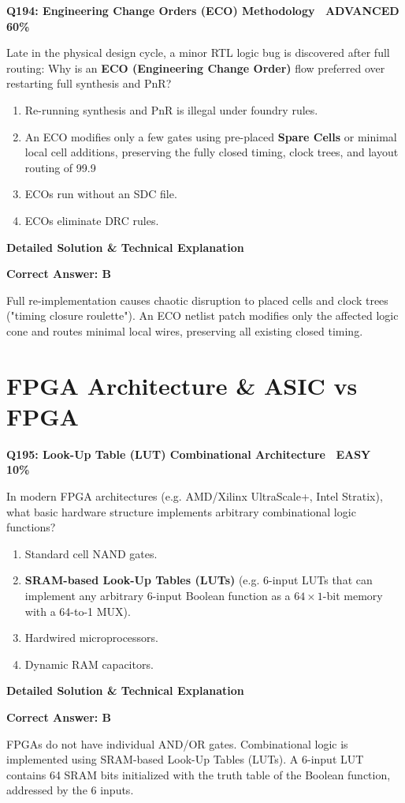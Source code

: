 \documentclass[11pt,a4paper]{article}
\newcommand{\badgeadv}{{\color{white}\colorbox{advred}{\bfseries\sffamily\tiny\ ADVANCED 60\%\ }}}
\newcommand{\badgeeasy}{{\color{white}\colorbox{easygreen}{\bfseries\sffamily\tiny\ EASY 10\%\ }}}
\newenvironment{qbox}[2]{%
  \begin{mdframed}[style=qstyle]%
  {\bfseries\sffamily\color{primaryblue}#1 \hfill #2}\par\vspace{2pt}%
}{%
  \end{mdframed}%
}
\newenvironment{ansbox}{%
  \begin{mdframed}[style=ansstyle]%
  {\bfseries\sffamily\color{ansgreen}\small Detailed Solution \& Technical Explanation}\par\vspace{2pt}\small%
}{%
  \end{mdframed}%
}
\begin{document}
\begin{qbox}{Q194: Engineering Change Orders (ECO) Methodology}{\badgeadv}
Late in the physical design cycle, a minor RTL logic bug is discovered after full routing:  
Why is an \textbf{ECO (Engineering Change Order)} flow preferred over restarting full synthesis and PnR?
\begin{enumerate}[label=\textbf{\Alph*.}]
  \item Re-running synthesis and PnR is illegal under foundry rules.
  \item An ECO modifies only a few gates using pre-placed \textbf{Spare Cells} or minimal local cell additions, preserving the fully closed timing, clock trees, and layout routing of 99.9%
  \item ECOs run without an SDC file.
  \item ECOs eliminate DRC rules.
\end{enumerate}
\end{qbox}
\begin{ansbox}
\textbf{Correct Answer: B}

Full re-implementation causes chaotic disruption to placed cells and clock trees ("timing closure roulette"). An ECO netlist patch modifies only the affected logic cone and routes minimal local wires, preserving all existing closed timing.
\end{ansbox}

\section{FPGA Architecture \& ASIC vs FPGA}

\begin{qbox}{Q195: Look-Up Table (LUT) Combinational Architecture}{\badgeeasy}
In modern FPGA architectures (e.g. AMD/Xilinx UltraScale+, Intel Stratix), what basic hardware structure implements arbitrary combinational logic functions?
\begin{enumerate}[label=\textbf{\Alph*.}]
  \item Standard cell NAND gates.
  \item \textbf{SRAM-based Look-Up Tables (LUTs)} (e.g. 6-input LUTs that can implement any arbitrary 6-input Boolean function as a $64 \times 1$-bit memory with a 64-to-1 MUX).
  \item Hardwired microprocessors.
  \item Dynamic RAM capacitors.
\end{enumerate}
\end{qbox}
\begin{ansbox}
\textbf{Correct Answer: B}

FPGAs do not have individual AND/OR gates. Combinational logic is implemented using SRAM-based Look-Up Tables (LUTs). A 6-input LUT contains 64 SRAM bits initialized with the truth table of the Boolean function, addressed by the 6 inputs.
\end{ansbox}
\end{document}
